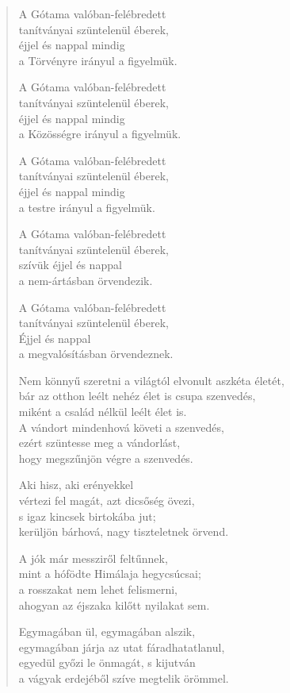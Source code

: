 \begin{verse}
 A Gótama valóban-felébredett\\
tanítványai szüntelenül éberek,\\
éjjel és nappal mindig\\
a Törvényre irányul a figyelmük.

 A Gótama valóban-felébredett\\
tanítványai szüntelenül éberek,\\
éjjel és nappal mindig\\
a Közösségre irányul a figyelmük.

\newpage

 A Gótama valóban-felébredett\\
tanítványai szüntelenül éberek,\\
éjjel és nappal mindig\\
a testre irányul a figyelmük.

 A Gótama valóban-felébredett\\
tanítványai szüntelenül éberek,\\
szívük éjjel és nappal\\
a nem-ártásban örvendezik.

 A Gótama valóban-felébredett\\
tanítványai szüntelenül éberek,\\
Éjjel és nappal\\
a megvalósításban örvendeznek.

 Nem könnyű szeretni a világtól elvonult aszkéta életét,\\
bár az otthon leélt nehéz élet is csupa szenvedés,\\
miként a család nélkül leélt élet is.\\
A vándort mindenhová követi a szenvedés,\\
ezért szüntesse meg a vándorlást,\\
hogy megszűnjön végre a szenvedés.

 Aki hisz, aki erényekkel\\
vértezi fel magát, azt dicsőség övezi,\\
s igaz kincsek birtokába jut;\\
kerüljön bárhová, nagy tiszteletnek örvend.

\newpage

 A jók már messziről feltűnnek,\\
mint a hófödte Himálaja hegycsúcsai;\\
a rosszakat nem lehet felismerni,\\
ahogyan az éjszaka kilőtt nyilakat sem.

 Egymagában ül, egymagában alszik,\\
egymagában járja az utat fáradhatatlanul,\\
egyedül győzi le önmagát, s kijutván\\
a vágyak erdejéből szíve megtelik örömmel.

\end{verse}
